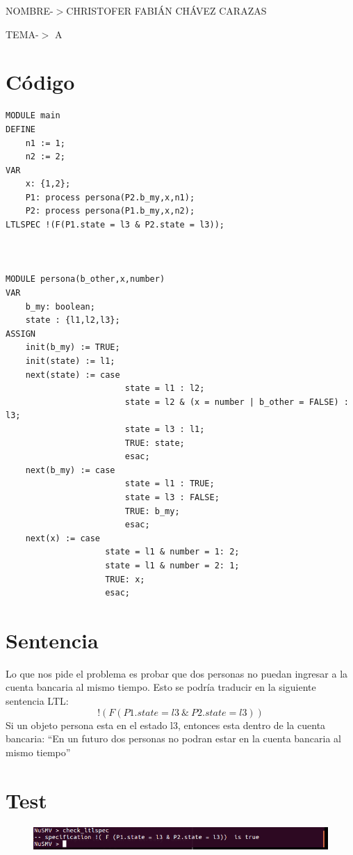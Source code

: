 \documentclass[a4paper,12pt]{article}
\begin{document}
\begin{Large}
 NOMBRE-$>$CHRISTOFER FABIÁN CHÁVEZ CARAZAS \par
 TEMA-$>$ A
\end{Large}

\section{Código}

  \begin{lstlisting}
MODULE main
DEFINE
	n1 := 1;
	n2 := 2;
VAR
	x: {1,2};
	P1: process persona(P2.b_my,x,n1);
	P2: process persona(P1.b_my,x,n2);
LTLSPEC !(F(P1.state = l3 & P2.state = l3));



MODULE persona(b_other,x,number)
VAR
	b_my: boolean;
	state : {l1,l2,l3};
ASSIGN
	init(b_my) := TRUE;
	init(state) := l1;
	next(state) := case
						state = l1 : l2;
						state = l2 & (x = number | b_other = FALSE) : l3;
						state = l3 : l1;
						TRUE: state;
						esac;
	next(b_my) := case
						state = l1 : TRUE;
						state = l3 : FALSE;
						TRUE: b_my;
						esac;
	next(x) := case
					state = l1 & number = 1: 2;
					state = l1 & number = 2: 1;
					TRUE: x;
					esac;

  \end{lstlisting}

\section{Sentencia}

Lo que nos pide el problema es probar que dos personas no puedan ingresar a la cuenta bancaria al mismo tiempo.
Esto se podría traducir en la siguiente sentencia LTL:
$$!(F(P1.state = l3 \ \& \ P2.state = l3))$$
Si un objeto persona esta en el estado l3, entonces esta dentro de la cuenta bancaria: ``En un futuro dos personas no podran estar en la cuenta bancaria al mismo tiempo''

\section{Test}

\begin{figure}[h]
 \centering
 \includegraphics[scale = 0.5]{1.png}
\end{figure}

  
\end{document}
